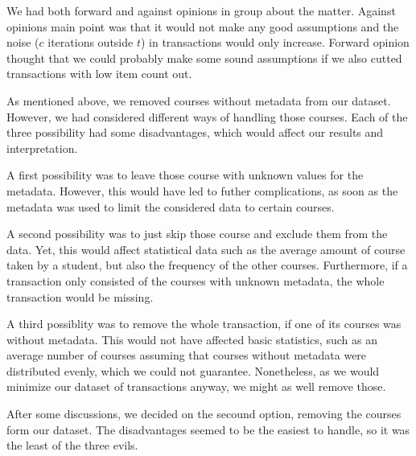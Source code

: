 We had both forward and against opinions
in group about the matter. Against opinions main point was that it would not make any good assumptions 
and the noise ($c$ iterations outside $t$) in transactions would only increase. Forward opinion thought that
we could probably make some sound assumptions if we also cutted transactions with low item count out.

As mentioned above, we removed courses without metadata from our dataset. However, we had considered different ways of handling those courses.
Each of the three possibility had some disadvantages, which would affect our results and interpretation.

A first possibility was to leave those course with unknown values for the metadata. However, this would have led to 
futher complications, as soon as the metadata was used to limit the considered data to certain courses. 

A second possibility was to just skip those course and exclude them from the data. Yet, this would affect
statistical data such as the average amount of course taken by a student, but also the frequency of the other courses.
Furthermore, if a transaction only consisted of the courses with unknown metadata, the whole transaction would be missing.


A third possiblity was to remove the whole transaction, if one of its courses was without metadata. 
This would not have affected basic statistics, such as an average number of courses assuming that courses without metadata were distributed evenly, which we could not guarantee.
Nonetheless, as we would minimize our dataset of transactions anyway, we might as well remove those.
\newline

After some discussions, we decided on the secound option, removing the courses form our dataset. The disadvantages seemed to be the easiest to handle, so it was the least of the three evils. 









